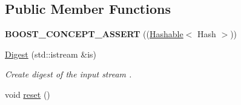 \subsection*{Public Member Functions}
\begin{DoxyCompactItemize}
\item 
{\bfseries B\+O\+O\+S\+T\+\_\+\+C\+O\+N\+C\+E\+P\+T\+\_\+\+A\+S\+S\+E\+RT} ((\hyperlink{classndn_1_1Hashable}{Hashable}$<$ Hash $>$))\hypertarget{classndn_1_1util_1_1Digest_a3a7b9097dc8c43cea19219e71fd2cc82}{}\label{classndn_1_1util_1_1Digest_a3a7b9097dc8c43cea19219e71fd2cc82}

\item 
\hyperlink{classndn_1_1util_1_1Digest_ab63645c16bd55cdd45a76152b1f1043b}{Digest} (std\+::istream \&is)
\begin{DoxyCompactList}\small\item\em Create digest of the input stream {\ttfamily }. \end{DoxyCompactList}\item 
void \hyperlink{classndn_1_1util_1_1Digest_afbdb1470bb66c7e4fe7089e33d3aa365}{reset} ()\hypertarget{classndn_1_1util_1_1Digest_afbdb1470bb66c7e4fe7089e33d3aa365}{}\label{classndn_1_1util_1_1Digest_afbdb1470bb66c7e4fe7089e33d3aa365}


\end{DoxyCompactItemize}

